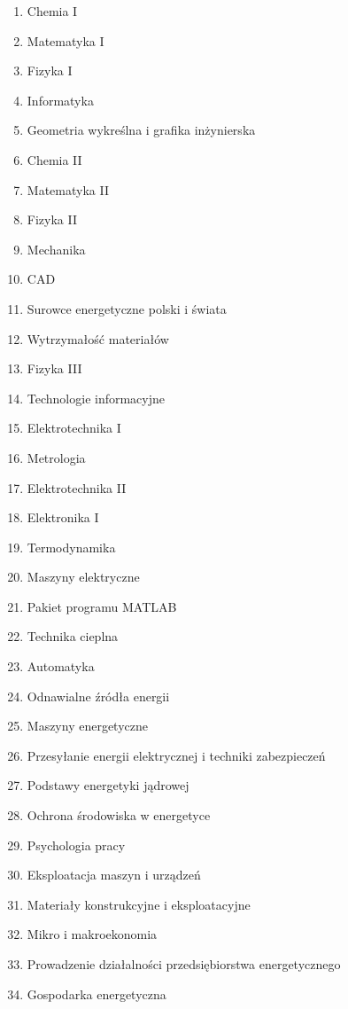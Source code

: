 \documentclass[a4paper,12pt]{article}
\begin{document}
\begin{multicols}{2}
\begin{enumerate}
\item Chemia I
\item Matematyka I
\item Fizyka I
\item Informatyka
\item Geometria wykreślna i grafika inżynierska
\item Chemia II
\item Matematyka II
\item Fizyka II
\item Mechanika
\item CAD
\item Surowce energetyczne polski i świata
\item Wytrzymałość materiałów
\item Fizyka III
\item Technologie informacyjne
\item Elektrotechnika I
\item Metrologia
\item Elektrotechnika II
\item Elektronika I
\item Termodynamika
\item Maszyny elektryczne
\item Pakiet programu MATLAB
\item Technika cieplna
\item Automatyka
\item Odnawialne źródła energii
\item Maszyny energetyczne
\item Przesyłanie energii elektrycznej i techniki zabezpieczeń
\item Podstawy energetyki jądrowej
\item Ochrona środowiska w energetyce
\item Psychologia pracy
\item Eksploatacja maszyn i urządzeń
\item Materiały konstrukcyjne i eksploatacyjne
\item Mikro i makroekonomia
\item Prowadzenie działalności przedsiębiorstwa energetycznego
\item Gospodarka energetyczna
\end{enumerate}
\end{multicols}
\end{document}

